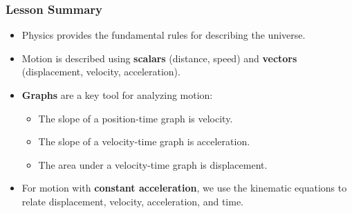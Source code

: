 \documentclass{beamer}
\begin{document}
\begin{frame}
\frametitle{Lesson Summary}
\begin{itemize}
    \item Physics provides the fundamental rules for describing the universe.
    \item Motion is described using \textbf{scalars} (distance, speed) and \textbf{vectors} (displacement, velocity, acceleration).
    \item \textbf{Graphs} are a key tool for analyzing motion:
        \begin{itemize}
            \item The slope of a position-time graph is \alert{velocity}.
            \item The slope of a velocity-time graph is \alert{acceleration}.
            \item The area under a velocity-time graph is \alert{displacement}.
        \end{itemize}
    \item For motion with \textbf{constant acceleration}, we use the kinematic equations to relate displacement, velocity, acceleration, and time.
\end{itemize}
\end{frame}
\end{document}
